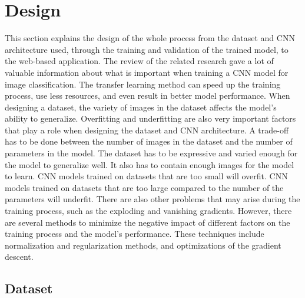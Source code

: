 \documentclass{BachelorBUI}
\begin{document}
\section{Design}

    This section explains the design of the whole process from the dataset and CNN architecture used, through the training and validation of the trained model, to the web-based application. The review of the related research gave a lot of valuable information about what is important when training a CNN model for image classification. The transfer learning method can speed up the training process, use less resources, and even result in better model performance. When designing a dataset, the variety of images in the dataset affects the model's ability to generalize. Overfitting and underfitting are also very important factors that play a role when designing the dataset and CNN architecture. A trade-off has to be done between the number of images in the dataset and the number of parameters in the model. The dataset has to be expressive and varied enough for the model to generalize well. It also has to contain enough images for the model to learn. CNN models trained on datasets that are too small will overfit. CNN models trained on datasets that are too large compared to the number of the parameters will underfit. There are also other problems that may arise during the training process, such as the exploding and vanishing gradients. However, there are several methods to minimize the negative impact of different factors on the training process and the model's performance. These techniques include normalization and regularization methods, and optimizations of the gradient descent.


    \subsection{Dataset}
\end{document}
